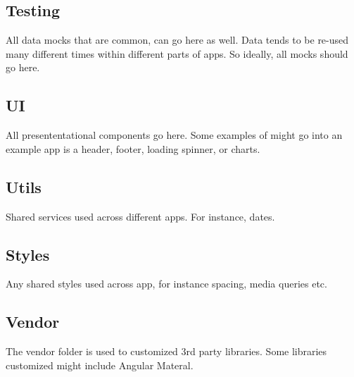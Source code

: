 \subsection{ Testing }
All data mocks that are common, can go here as well. Data tends to be re-used
many different times within different parts of apps. So ideally, all mocks
should go here.

\subsection{ UI }
All presententational components go here. Some examples of might go into an
example app is a header, footer, loading spinner, or charts.

\subsection{ Utils }
Shared services used across different apps. For instance, dates.

\subsection{ Styles }
Any shared styles used across app, for instance spacing, media queries etc.

\subsection{ Vendor }
The vendor folder is used to customized 3rd party libraries. Some libraries
customized might include Angular Materal.
